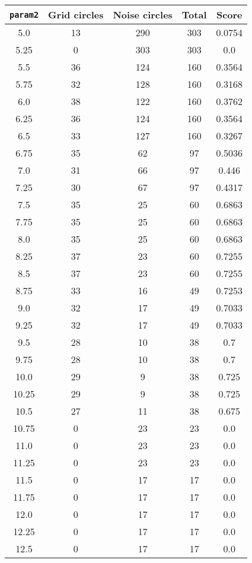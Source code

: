 \documentclass[letterpaper, 12pt]{article}
\begin{document}
\begin{longtable}{|c|c|c|c|c|}
\hline
\textbf{\texttt{param2}} & \textbf{Grid circles} & \textbf{Noise circles} & \textbf{Total} & \textbf{Score} \\
\hline
5.0 & 13 & 290 & 303 & 0.0754 \\
\hline
5.25 & 0 & 303 & 303 & 0.0 \\
\hline
5.5 & 36 & 124 & 160 & 0.3564 \\
\hline
5.75 & 32 & 128 & 160 & 0.3168 \\
\hline
6.0 & 38 & 122 & 160 & 0.3762 \\
\hline
6.25 & 36 & 124 & 160 & 0.3564 \\
\hline
6.5 & 33 & 127 & 160 & 0.3267 \\
\hline
6.75 & 35 & 62 & 97 & 0.5036 \\
\hline
7.0 & 31 & 66 & 97 & 0.446 \\
\hline
7.25 & 30 & 67 & 97 & 0.4317 \\
\hline
7.5 & 35 & 25 & 60 & 0.6863 \\
\hline
7.75 & 35 & 25 & 60 & 0.6863 \\
\hline
8.0 & 35 & 25 & 60 & 0.6863 \\
\hline
8.25 & 37 & 23 & 60 & 0.7255 \\
\hline
8.5 & 37 & 23 & 60 & 0.7255 \\
\hline
8.75 & 33 & 16 & 49 & 0.7253 \\
\hline
9.0 & 32 & 17 & 49 & 0.7033 \\
\hline
9.25 & 32 & 17 & 49 & 0.7033 \\
\hline
9.5 & 28 & 10 & 38 & 0.7 \\
\hline
9.75 & 28 & 10 & 38 & 0.7 \\
\hline
10.0 & 29 & 9 & 38 & 0.725 \\
\hline
10.25 & 29 & 9 & 38 & 0.725 \\
\hline
10.5 & 27 & 11 & 38 & 0.675 \\
\hline
10.75 & 0 & 23 & 23 & 0.0 \\
\hline
11.0 & 0 & 23 & 23 & 0.0 \\
\hline
11.25 & 0 & 23 & 23 & 0.0 \\
\hline
11.5 & 0 & 17 & 17 & 0.0 \\
\hline
11.75 & 0 & 17 & 17 & 0.0 \\
\hline
12.0 & 0 & 17 & 17 & 0.0 \\
\hline
12.25 & 0 & 17 & 17 & 0.0 \\
\hline
12.5 & 0 & 17 & 17 & 0.0 \\

\end{longtable}
\end{document}
